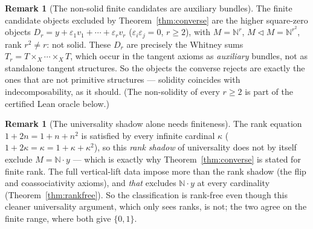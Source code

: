 \documentclass[11pt]{article}
\theoremstyle{definition}
\newtheorem{remark}[theorem]{Remark}
\newcommand{\N}{\mathbb{N}}
\begin{document}
\begin{remark}[The non-solid finite candidates are auxiliary bundles]\label{rem:whitney}
The finite candidate objects excluded by Theorem~\ref{thm:converse} are the higher square-zero
objects $D_r=y+\varepsilon_1 v_1+\cdots+\varepsilon_r v_r$ ($\varepsilon_i\varepsilon_j=0$, $r\ge2$),
with $M=\N^r$, $M\lhd M=\N^{r^2}$, rank $r^2\ne r$: not solid. These $D_r$ are precisely the Whitney
sums $T_r=T\times_X\cdots\times_X T$, which occur in the tangent axioms as \emph{auxiliary} bundles,
not as standalone tangent structures. So the objects the converse rejects are exactly the ones that
are not primitive structures --- solidity coincides with indecomposability, as it should. (The
non-solidity of every $r\ge2$ is part of the certified Lean oracle below.)
\end{remark}

\begin{remark}[The universality shadow alone needs finiteness]\label{rem:shadow}
The rank equation $1+2n=1+n+n^2$ is satisfied by every infinite cardinal $\kappa$
($1+2\kappa=\kappa=1+\kappa+\kappa^2$), so this \emph{rank shadow} of universality does not by itself
exclude $M=\N\cdot y$ --- which is exactly why Theorem~\ref{thm:converse} is stated for finite rank.
The full vertical-lift data impose more than the rank shadow (the flip and coassociativity axioms),
and \emph{that} excludes $\N\cdot y$ at every cardinality (Theorem~\ref{thm:rankfree}). So the
classification is rank-free even though this cleaner universality argument, which only sees ranks, is
not; the two agree on the finite range, where both give $\{0,1\}$.
\end{remark}
\end{document}
